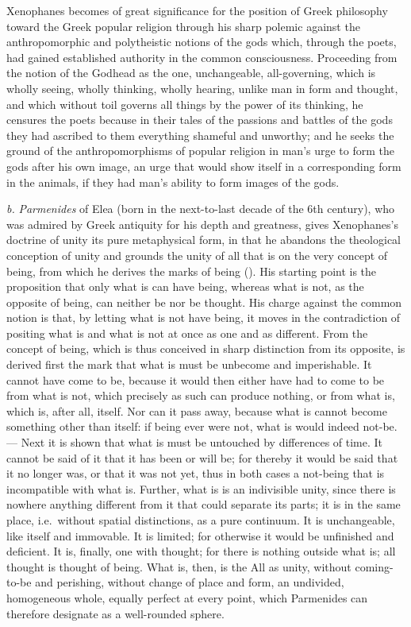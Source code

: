 Xenophanes becomes of great significance for the position of Greek philosophy toward
the Greek popular religion through his sharp
polemic against the anthropomorphic and polytheistic notions of the gods which, through the poets, had gained established authority in the common consciousness. Proceeding from the notion of the Godhead as
the one, unchangeable, all-governing, which is wholly seeing, wholly
thinking, wholly hearing, unlike man in form and thought,
and which without toil governs all things by the power of its thinking,
he censures the poets because in their tales of the passions
and battles of the gods they had ascribed to them everything shameful and
unworthy; and he seeks the ground of the anthropomorphisms of popular religion in man's urge to form the gods after
his own image, an urge that would show itself in a corresponding form in
the animals, if they had man's ability to form images of the gods.

\textit{b.} \emph{Parmenides} of Elea (born in the next-to-last decade of the 6th century), who was admired by Greek antiquity for
his depth and greatness, gives Xenophanes's doctrine of unity its
pure metaphysical form, in that he abandons the theological conception of unity and grounds the unity of all that is on
the very concept of being, from which he derives the marks of being (). His starting point is the proposition that
only what is can have being, whereas what is not,
as the opposite of being, can neither be nor be thought. His
charge against the common notion is that, by letting what is not have being, it moves
in the contradiction
of positing what is and what is not at once as
one and as different. From the concept of being, which is thus conceived in sharp distinction from its opposite, is derived first the
mark that what is must be unbecome and imperishable. It cannot have come to be, because it would then either
have had to come to be from what is not, which precisely as
such can produce nothing, or from what is, which is, after all,
itself. Nor can it pass away, because what is cannot
become something other than itself: if being ever were
not, what is would indeed not-be. --- Next it is shown
that what is must be untouched by differences of time. It cannot
be said of it that it has been or will be; for thereby it would be said that it no longer was, or that it was not
yet, thus in both cases a not-being that is incompatible with what is. Further, what is is an indivisible unity, since there is nowhere anything different from it
that could separate its parts; it is in the same place, i.e.\ without
spatial distinctions, as a pure continuum. It is unchangeable, like itself and immovable. It is limited; for
otherwise it would be unfinished and deficient. It is, finally, one with thought; for there is nothing outside what is;
all thought is thought of being. What is, then, is the All as
unity, without coming-to-be and perishing, without change of
place and form, an undivided, homogeneous whole, equally
perfect at every point, which Parmenides can therefore designate as
a well-rounded sphere.

